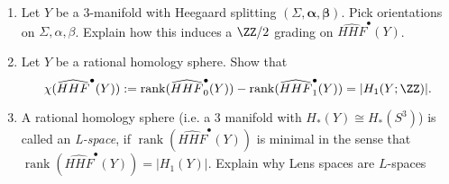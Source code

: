 

     \begin{enumerate}
            \item Let $Y$ be a $3$-manifold with Heegaard splitting $(\Sigma,\mathbf{\alpha},\mathbf{\beta})$. Pick  orientations on $\Sigma,\alpha,\beta$. Explain how this induces a $\ZZ/2$ grading on $\widehat{HHF}^\bullet(Y)$.
            
            \item Let $Y$ be a rational homology sphere. Show that 
            \[\chi(\widehat{HHF}^\bullet(Y)):=\operatorname{rank}(\widehat{HHF}^\bullet_0(Y))-\operatorname{rank}(\widehat{HHF}^\bullet_1(Y))=|H_1(Y;\ZZ)|.\]
            
            \item A rational homology sphere (i.e. a 3 manifold with $H_*(Y)\cong H_*(S^3)$) is called an \emph{L-space}, if $\operatorname{rank}(\widehat{HHF}^\bullet(Y))$ is minimal in the sense that $\operatorname{rank}(\widehat{HHF}^\bullet(Y))=|H_1(Y)|$. Explain why Lens spaces are $L$-spaces
        \end{enumerate}

